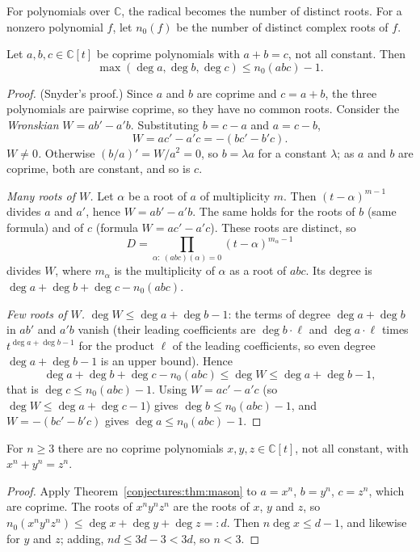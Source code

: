 For polynomials over $\mathbb C$, the radical becomes the number of distinct roots. For a nonzero polynomial $f$, let $n_0(f)$ be the number of distinct
complex roots of $f$.

\begin{theorem}\label{conjectures:thm:mason}
Let $a,b,c\in\mathbb C[t]$ be coprime polynomials with $a+b=c$, not all constant. Then
\[
\max(\deg a,\deg b,\deg c)\le n_0(abc)-1.
\]
\end{theorem}
\begin{proof}
(Snyder's proof.) Since $a$ and $b$ are coprime and $c=a+b$, the three polynomials are pairwise coprime, so they have no common roots. Consider the
\emph{Wronskian} $W=ab'-a'b$. Substituting $b=c-a$ and $a=c-b$,
\[
W=ac'-a'c=-(bc'-b'c).
\]
\emph{$W\ne0$.} Otherwise $(b/a)'=W/a^2=0$, so $b=\lambda a$ for a constant $\lambda$; as $a$ and $b$ are coprime, both are constant, and so is $c$.

\emph{Many roots of $W$.} Let $\alpha$ be a root of $a$ of multiplicity $m$. Then $(t-\alpha)^{m-1}$ divides $a$ and $a'$, hence $W=ab'-a'b$. The same holds for
the roots of $b$ (same formula) and of $c$ (formula $W=ac'-a'c$). These roots are distinct, so
\[
D=\prod_{\alpha:\ (abc)(\alpha)=0}(t-\alpha)^{m_\alpha-1}
\]
divides $W$, where $m_\alpha$ is the multiplicity of $\alpha$ as a root of $abc$. Its degree is $\deg a+\deg b+\deg c-n_0(abc)$.

\emph{Few roots of $W$.} $\deg W\le\deg a+\deg b-1$: the terms of degree $\deg a+\deg b$ in $ab'$ and $a'b$ vanish (their leading coefficients are
$\deg b\cdot\ell$ and $\deg a\cdot\ell$ times $t^{\deg a+\deg b-1}$ for the product $\ell$ of the leading coefficients, so even degree $\deg a+\deg b-1$ is
an upper bound). Hence
\[
\deg a+\deg b+\deg c-n_0(abc)\le\deg W\le\deg a+\deg b-1,
\]
that is $\deg c\le n_0(abc)-1$. Using $W=ac'-a'c$ (so $\deg W\le\deg a+\deg c-1$) gives $\deg b\le n_0(abc)-1$, and $W=-(bc'-b'c)$ gives
$\deg a\le n_0(abc)-1$.
\end{proof}

\begin{corollary}\label{conjectures:cor:fermatpoly}
For $n\ge3$ there are no coprime polynomials $x,y,z\in\mathbb C[t]$, not all constant, with $x^n+y^n=z^n$.
\end{corollary}
\begin{proof}
Apply Theorem~\ref{conjectures:thm:mason} to $a=x^n$, $b=y^n$, $c=z^n$, which are coprime. The roots of $x^ny^nz^n$ are the roots of $x$, $y$ and $z$, so
$n_0(x^ny^nz^n)\le\deg x+\deg y+\deg z=:d$. Then $n\deg x\le d-1$, and likewise for $y$ and $z$; adding, $nd\le3d-3<3d$, so $n<3$.
\end{proof}

